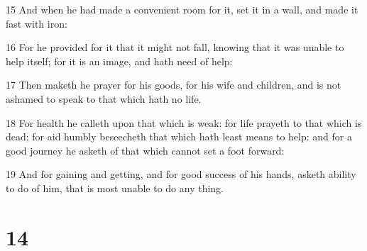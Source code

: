 \par 15 And when he had made a convenient room for it, set it in a wall, and made it fast with iron:
\par 16 For he provided for it that it might not fall, knowing that it was unable to help itself; for it is an image, and hath need of help:
\par 17 Then maketh he prayer for his goods, for his wife and children, and is not ashamed to speak to that which hath no life.
\par 18 For health he calleth upon that which is weak: for life prayeth to that which is dead; for aid humbly beseecheth that which hath least means to help: and for a good journey he asketh of that which cannot set a foot forward:
\par 19 And for gaining and getting, and for good success of his hands, asketh ability to do of him, that is most unable to do any thing.

\chapter{14}

